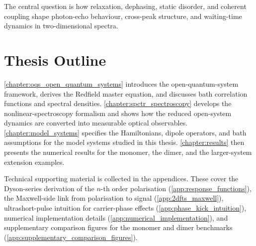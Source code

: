 The central question is how relaxation, dephasing, static disorder, and
coherent coupling shape photon-echo behaviour, cross-peak structure, and
waiting-time dynamics in two-dimensional spectra.

\section{Thesis Outline}
\label{sec:intro_outline}

\autoref{chapter:oqs_open_quantum_systems} introduces the open-quantum-system
framework, derives the Redfield master equation, and discusses bath
correlation functions and spectral densities. \autoref{chapter:spctr_spectroscopy}
develops the nonlinear-spectroscopy formalism and shows how the reduced
open-system dynamics are converted into measurable optical observables.
\autoref{chapter:model_systems} specifies the Hamiltonians, dipole
operators, and bath assumptions for the model systems studied in this
thesis. \autoref{chapter:results} then presents the numerical results for
the monomer, the dimer, and the larger-system extension examples.

Technical supporting material is collected in the appendices. These cover the
Dyson-series derivation of the
\(n\)-th order polarisation (\autoref{app:response_functions}), the
Maxwell-side link from polarisation to signal
(\autoref{app:2dfts_maxwell}), ultrashort-pulse intuition for carrier-phase
effects (\autoref{app:phase_kick_intuition}), numerical
implementation details (\autoref{app:numerical_implementation}), and
supplementary comparison figures for the monomer and dimer benchmarks
(\autoref{app:supplementary_comparison_figures}).
